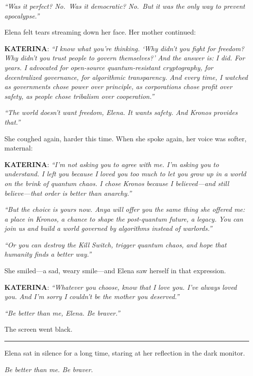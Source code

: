 \emph{``Was it perfect? No.~Was it democratic? No.~But it was the only way to prevent apocalypse.''}

Elena felt tears streaming down her face. Her mother continued:

\textbf{KATERINA}: \emph{``I know what you're thinking. `Why didn't you fight for freedom? Why didn't you trust people to govern themselves?' And the answer is: I did. For years. I advocated for open-source quantum-resistant cryptography, for decentralized governance, for algorithmic transparency. And every time, I watched as governments chose power over principle, as corporations chose profit over safety, as people chose tribalism over cooperation.''}

\emph{``The world doesn't want freedom, Elena. It wants safety. And Kronos provides that.''}

She coughed again, harder this time. When she spoke again, her voice was softer, maternal:

\textbf{KATERINA}: \emph{``I'm not asking you to agree with me. I'm asking you to understand. I left you because I loved you too much to let you grow up in a world on the brink of quantum chaos. I chose Kronos because I believed---and still believe---that order is better than anarchy.''}

\emph{``But the choice is yours now. Anya will offer you the same thing she offered me: a place in Kronos, a chance to shape the post-quantum future, a legacy. You can join us and build a world governed by algorithms instead of warlords.''}

\emph{``Or you can destroy the Kill Switch, trigger quantum chaos, and hope that humanity finds a better way.''}

She smiled---a sad, weary smile---and Elena saw herself in that expression.

\textbf{KATERINA}: \emph{``Whatever you choose, know that I love you. I've always loved you. And I'm sorry I couldn't be the mother you deserved.''}

\emph{``Be better than me, Elena. Be braver.''}

The screen went black.

\begin{center}\rule{0.5\linewidth}{0.5pt}\end{center}

Elena sat in silence for a long time, staring at her reflection in the dark monitor.

\emph{Be better than me. Be braver.}

